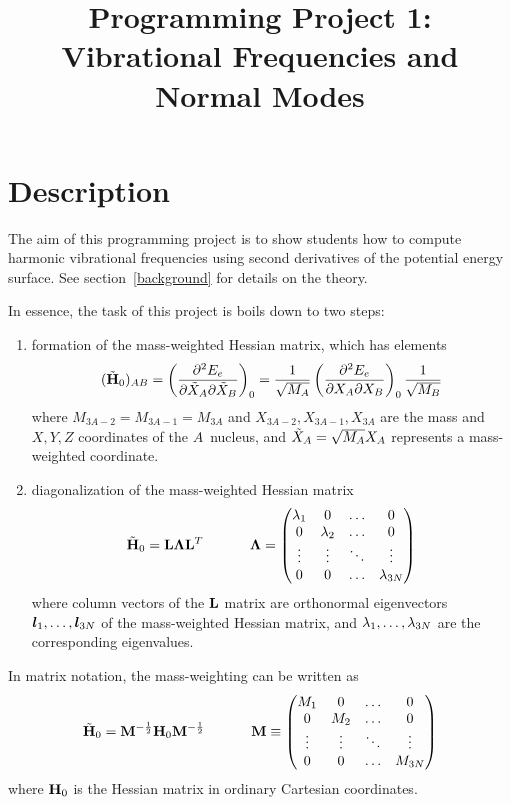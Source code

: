 \documentclass[11pt]{article}
\title{Programming Project 1: Vibrational Frequencies and Normal Modes}
\author{}
\date{}
\begin{document}
\maketitle

\section*{Description}
The aim of this programming project is to show students how to compute harmonic vibrational frequencies using second derivatives of the potential energy surface.
See section~\ref{background} for details on the theory.

In essence, the task of this project is boils down to two steps:
\begin{enumerate}
	\item formation of the mass-weighted Hessian matrix, which has elements
	\begin{align}
		(\tilde{\mathbf{H}}_0)_{AB}
	=
		\left(\dfrac{\partial^2E_e}{\partial\tilde{X}_A\partial\tilde{X}_B}\right)_0
	=
		\dfrac{1}{\sqrt{M_A}}
		\left(\dfrac{\partial^2E_e}{\partial X_A\partial X_B}\right)_0
		\dfrac{1}{\sqrt{M_B}}
	\end{align}
	where $M_{3A-2}=M_{3A-1}=M_{3A}$ and $X_{3A-2}, X_{3A-1}, X_{3A}$ are the mass and $X,Y,Z$ coordinates of the $A$\eth\ nucleus, and $\tilde{X}_A=\sqrt{M_A}X_A$ represents a mass-weighted coordinate.
	\item diagonalization of the mass-weighted Hessian matrix
	\begin{align}
		\tilde{\mathbf{H}}_0
	=
		\mathbf{L}
		\bm{\Lambda}
		\mathbf{L}^T
	\ \ \ \ \ \ \ \ \ \ 
		\bm{\Lambda}
	=
		\left(\begin{matrix}\lambda_1&0&\ldots&0\\
			0&\lambda_2&\ldots&0\\
			\vdots&\vdots&\ddots&\vdots\\
			0&0&\ldots&\lambda_{3N}\end{matrix}\right)
	\end{align}
where column vectors of the $\mathbf{L}$ matrix are orthonormal eigenvectors $\bm{l}_1,\ldots,\bm{l}_{3N}$ of the mass-weighted Hessian matrix, and $\lambda_1,\ldots,\lambda_{3N}$ are the corresponding eigenvalues.
\end{enumerate}
In matrix notation, the mass-weighting can be written as
\begin{align}
%
	\tl{\bo{H}}_0
=
	\bo{M}^{-\frac{1}{2}}
	\bo{H}_0
	\bo{M}^{-\frac{1}{2}}
\sp
	\bo{M}
\equiv
	\ma{M_1&0&\ld&0\\
		0&M_2&\ld&0\\
		\vd&\vd&\dd&\vd\\
		0&0&\ld&M_{3N}}
\end{align}
where $\mathbf{H}_0$ is the Hessian matrix in ordinary Cartesian coordinates.
\end{document}
